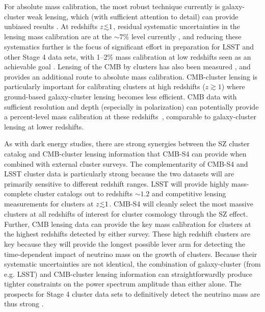 For absolute mass calibration, the most robust technique currently is galaxy-cluster weak lensing, which (with sufficient attention to detail) can provide unbiased results \cite{Corless:2009hi,Becker:2010xj}. At redshifts $z\lsim1$, residual systematic uncertainties in the lensing mass calibration are at the $\sim7\%$ level currently \cite{Applegate:2012kr}, and reducing these systematics further is the focus of significant effort in preparation for LSST and other Stage 4 data sets, with 1--2\% mass calibration at low redshifts seen as an achievable goal \cite{Abate:2012za}. Lensing of the CMB by clusters has also been measured \cite{Madhavacheril:2014slf,Baxter:2014frs}, and provides an additional route to absolute mass calibration. CMB-cluster lensing is particularly important for calibrating clusters at high redshifts ($z\gtrsim1$) where ground-based galaxy-cluster lensing becomes less efficient. CMB data with sufficient resolution and depth (especially in polarization) can potentially provide a percent-level mass calibration at these redshifts~\cite{Hu:2007bt}, comparable to galaxy-cluster lensing at lower redshifts.

As with dark energy studies, there are strong synergies between the SZ cluster catalog and CMB-cluster lensing information that CMB-S4 can provide when combined with external cluster surveys. The complementarity of CMB-S4 and LSST cluster data is particularly strong because the two datasets will are primarily sensitive to different redshift ranges. LSST will provide highly mass-complete cluster catalogs out to redshifts $\sim1.2$ and competitive lensing measurements for clusters at $z\lsim 1$. CMB-S4 will cleanly select the most massive clusters at all redshifts of interest for cluster cosmology through the SZ effect. Further, CMB lensing data can provide the key mass calibration for clusters at the highest redshifts detected by either survey. These high redshift clusters are key because they will provide the longest possible lever arm for detecting the time-dependent impact of neutrino mass on the growth of clusters.  Because their systematic uncertainties are not identical, the combination of galaxy-cluster (from e.g. LSST) and CMB-cluster lensing information can straightforwardly produce tighter constraints on the power spectrum amplitude than either alone. The prospects for Stage 4 cluster data sets to definitively detect the neutrino mass are thus strong \cite{Mantz:2014paa,Wang:2005vr}.




